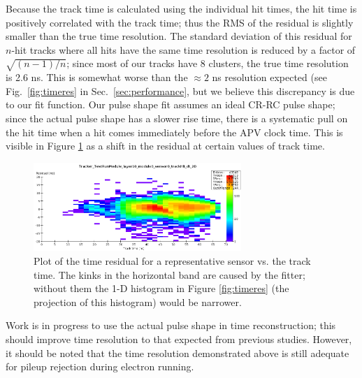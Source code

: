 Because the track time is calculated using the individual hit times, the hit time is positively correlated 
with the track time; thus the RMS of the residual is slightly smaller than the true time resolution.
The standard deviation of this residual for $n$-hit tracks where all hits have the same time resolution 
is reduced by a factor of $\sqrt{(n-1)/n}$; since most of our tracks have 8 clusters, the true time 
resolution is 2.6 ns. 
This is somewhat worse than the $\approx 2$ ns resolution expected (see Fig.~\ref{fig:timeres} in 
Sec.~\ref{sec:performance}, but we believe this discrepancy is due to our fit function. Our pulse 
shape fit assumes an ideal CR-RC pulse shape; since the actual pulse shape has a slower rise time, 
there is a systematic pull on the hit time when a hit comes immediately before the APV clock time. 
This is visible in Figure \ref{fig:timeres_2D} as a shift in the residual at certain values of track time.
\begin{figure}[h]
	\includegraphics[width=0.7\textwidth]{test2012/svtperformance/timeres_2D}
	\caption{\small{Plot of the time residual for a representative sensor vs. the track time. 
		The kinks in the horizontal band are caused by the fitter; without them the 1-D histogram in Figure \ref{fig:timeres} (the projection of this histogram) would be narrower.} }
	\label{fig:timeres_2D}
\end{figure}
Work is in progress to use the actual pulse shape in time reconstruction; this should improve time resolution to that expected from previous studies. 
However, it should be noted that the time resolution demonstrated above is still adequate for pileup rejection during electron running.

